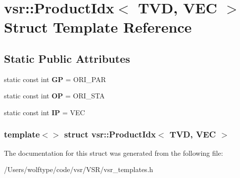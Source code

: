 \hypertarget{structvsr_1_1_product_idx_3_01_t_v_d_00_01_v_e_c_01_4}{\section{vsr\-:\-:Product\-Idx$<$ T\-V\-D, V\-E\-C $>$ Struct Template Reference}
\label{structvsr_1_1_product_idx_3_01_t_v_d_00_01_v_e_c_01_4}
}
\subsection*{Static Public Attributes}
\begin{DoxyCompactItemize}
\item 
\hypertarget{structvsr_1_1_product_idx_3_01_t_v_d_00_01_v_e_c_01_4_aaedbcdd8f08cceb1cf8b6e921b3d5cfc}{static const int {\bfseries G\-P} = O\-R\-I\-\_\-\-P\-A\-R}\label{structvsr_1_1_product_idx_3_01_t_v_d_00_01_v_e_c_01_4_aaedbcdd8f08cceb1cf8b6e921b3d5cfc}

\item 
\hypertarget{structvsr_1_1_product_idx_3_01_t_v_d_00_01_v_e_c_01_4_a5d65453e911acd05aa6211408e015118}{static const int {\bfseries O\-P} = O\-R\-I\-\_\-\-S\-T\-A}\label{structvsr_1_1_product_idx_3_01_t_v_d_00_01_v_e_c_01_4_a5d65453e911acd05aa6211408e015118}

\item 
\hypertarget{structvsr_1_1_product_idx_3_01_t_v_d_00_01_v_e_c_01_4_aeef752e7248fc51f0c1374a44643e970}{static const int {\bfseries I\-P} = V\-E\-C}\label{structvsr_1_1_product_idx_3_01_t_v_d_00_01_v_e_c_01_4_aeef752e7248fc51f0c1374a44643e970}

\end{DoxyCompactItemize}
\subsubsection*{template$<$$>$ struct vsr\-::\-Product\-Idx$<$ T\-V\-D, V\-E\-C $>$}



The documentation for this struct was generated from the following file\-:\begin{DoxyCompactItemize}
\item 
/\-Users/wolftype/code/vsr/\-V\-S\-R/vsr\-\_\-templates.\-h\end{DoxyCompactItemize}
